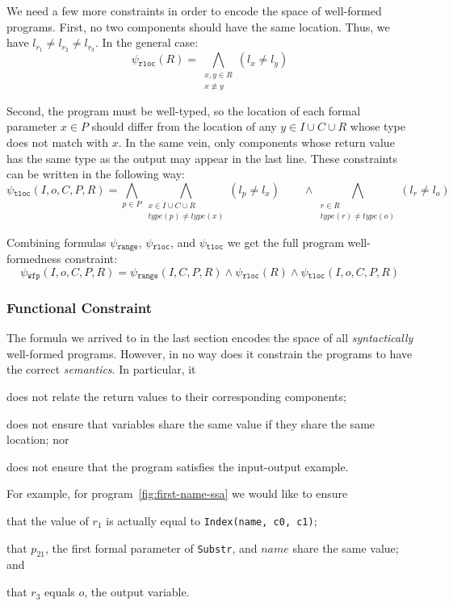 We need a few more constraints in order to encode the space of well-formed
programs. First, no two components should have the same location. Thus,
we have $l_{r_1} \neq l_{r_2} \neq l_{r_3}$. In the general case:
%
\[
  \psi{}_{\mathtt{rloc}}(R) =
  \bigwedge_{\substack{x, y \in R\\ x \not\equiv y}} (l_{x} \neq l_{y}) 
\]

\noindent
Second, the program must be well-typed, so the location of each formal parameter
$x \in P$ should differ from the location of any $y \in I \cup C \cup R$ whose
type does not match with $x$. In the same vein, only components whose return
value has the same type as the output may appear in the last line. These
constraints can be written in the following way:
%
\[
  \psi{}_{\mathtt{tloc}}(I, o, C, P, R) =
  \bigwedge_{p \in P}
  \bigwedge_{\substack{x \in I \cup C \cup R \\ type(p) \neq type(x)}}
  (l_p \neq l_x)
  \qquad \wedge
  \bigwedge_{\substack{r \in R \\ type(r) \neq type(o)}}
  (l_r \neq l_o)
\]

Combining formulas $\psi{}_{\mathtt{range}}$, $\psi{}_{\mathtt{rloc}}$, and
$\psi{}_{\mathtt{tloc}}$ we get the full program well-formedness constraint:
%
\[
  \psi{}_{\mathtt{wfp}}(I, o, C, P, R) =
  \psi{}_{\mathtt{range}}(I, C, P, R)
  \wedge \psi{}_{\mathtt{rloc}}(R)
  \wedge \psi{}_{\mathtt{tloc}}(I, o, C, P, R)
\]

\subsubsection{Functional Constraint}
\label{sec:functional-constraint}

The formula we arrived to in the last section encodes the space of all
\textit{syntactically} well-formed programs. However, in no way does it
constrain the programs to have the correct \textit{semantics}.
In particular, it 
\begin{enumerate*}[(1)]
\item \label{itm:fc-one} does not relate the return values to their
corresponding components;
\item \label{itm:fc-two} does not ensure that variables share the same value if they
share the same location; nor
\item \label{itm:fc-three} does not ensure that the program satisfies the
input-output example.
\end{enumerate*}
For example, for program~\ref{fig:first-name-ssa} we would like to ensure
\begin{enumerate*}[(1)]
\item that the value of $r_1$ is actually equal to \lstinline{Index(name, c0, c1)};
\item that $p_{21}$, the first formal parameter of \lstinline{Substr}, and $name$
  share the same value; and
\item that $r_3$ equals $o$, the output variable.
\end{enumerate*}

